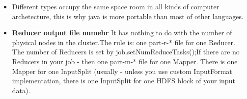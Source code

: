 \documentclass[a4paper]{tufte-handout}
\begin{document}
\begin{itemize}
\item Different types occupy the same space room in all kinds of computer archetecture, this is why java is more portable than most of other languages.
\end{itemize}
\begin{note}

  \begin{itemize}
    \item \textbf{Reducer output file numebr} It has nothing to do with the number of physical nodes in the cluster.The rule is: one part-r-* file for one Reducer. The number of Reducers is set by job.setNumReduceTasks();If there are no Reducers in your job - then one part-m-* file for one Mapper. There is one Mapper for one InputSplit (usually - unless you use custom InputFormat implementation, there is one InputSplit for one HDFS block of your input data).

  \end{itemize}
\end{note}





\end{document}
